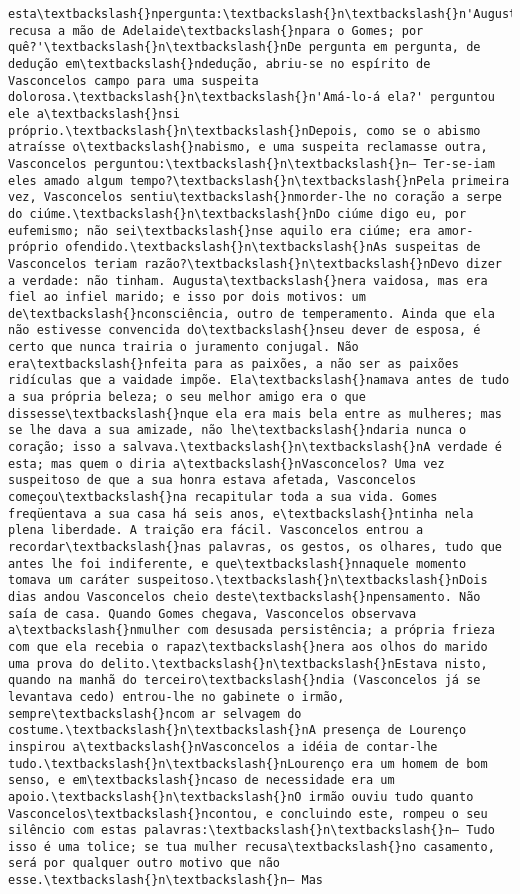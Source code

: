 \documentclass[11pt]{article}
\begin{document}
\begin{Verbatim}[commandchars=\\\{\}]
esta\textbackslash{}npergunta:\textbackslash{}n\textbackslash{}n'Augusta recusa a mão de Adelaide\textbackslash{}npara o Gomes; por quê?'\textbackslash{}n\textbackslash{}nDe pergunta em pergunta, de dedução em\textbackslash{}ndedução, abriu-se no espírito de Vasconcelos campo para uma suspeita dolorosa.\textbackslash{}n\textbackslash{}n'Amá-lo-á ela?' perguntou ele a\textbackslash{}nsi próprio.\textbackslash{}n\textbackslash{}nDepois, como se o abismo atraísse o\textbackslash{}nabismo, e uma suspeita reclamasse outra, Vasconcelos perguntou:\textbackslash{}n\textbackslash{}n— Ter-se-iam eles amado algum tempo?\textbackslash{}n\textbackslash{}nPela primeira vez, Vasconcelos sentiu\textbackslash{}nmorder-lhe no coração a serpe do ciúme.\textbackslash{}n\textbackslash{}nDo ciúme digo eu, por eufemismo; não sei\textbackslash{}nse aquilo era ciúme; era amor-próprio ofendido.\textbackslash{}n\textbackslash{}nAs suspeitas de Vasconcelos teriam razão?\textbackslash{}n\textbackslash{}nDevo dizer a verdade: não tinham. Augusta\textbackslash{}nera vaidosa, mas era fiel ao infiel marido; e isso por dois motivos: um de\textbackslash{}nconsciência, outro de temperamento. Ainda que ela não estivesse convencida do\textbackslash{}nseu dever de esposa, é certo que nunca trairia o juramento conjugal. Não era\textbackslash{}nfeita para as paixões, a não ser as paixões ridículas que a vaidade impõe. Ela\textbackslash{}namava antes de tudo a sua própria beleza; o seu melhor amigo era o que dissesse\textbackslash{}nque ela era mais bela entre as mulheres; mas se lhe dava a sua amizade, não lhe\textbackslash{}ndaria nunca o coração; isso a salvava.\textbackslash{}n\textbackslash{}nA verdade é esta; mas quem o diria a\textbackslash{}nVasconcelos? Uma vez suspeitoso de que a sua honra estava afetada, Vasconcelos começou\textbackslash{}na recapitular toda a sua vida. Gomes freqüentava a sua casa há seis anos, e\textbackslash{}ntinha nela plena liberdade. A traição era fácil. Vasconcelos entrou a recordar\textbackslash{}nas palavras, os gestos, os olhares, tudo que antes lhe foi indiferente, e que\textbackslash{}nnaquele momento tomava um caráter suspeitoso.\textbackslash{}n\textbackslash{}nDois dias andou Vasconcelos cheio deste\textbackslash{}npensamento. Não saía de casa. Quando Gomes chegava, Vasconcelos observava a\textbackslash{}nmulher com desusada persistência; a própria frieza com que ela recebia o rapaz\textbackslash{}nera aos olhos do marido uma prova do delito.\textbackslash{}n\textbackslash{}nEstava nisto, quando na manhã do terceiro\textbackslash{}ndia (Vasconcelos já se levantava cedo) entrou-lhe no gabinete o irmão, sempre\textbackslash{}ncom ar selvagem do costume.\textbackslash{}n\textbackslash{}nA presença de Lourenço inspirou a\textbackslash{}nVasconcelos a idéia de contar-lhe tudo.\textbackslash{}n\textbackslash{}nLourenço era um homem de bom senso, e em\textbackslash{}ncaso de necessidade era um apoio.\textbackslash{}n\textbackslash{}nO irmão ouviu tudo quanto Vasconcelos\textbackslash{}ncontou, e concluindo este, rompeu o seu silêncio com estas palavras:\textbackslash{}n\textbackslash{}n— Tudo isso é uma tolice; se tua mulher recusa\textbackslash{}no casamento, será por qualquer outro motivo que não esse.\textbackslash{}n\textbackslash{}n— Mas 
\end{Verbatim}
\end{document}
